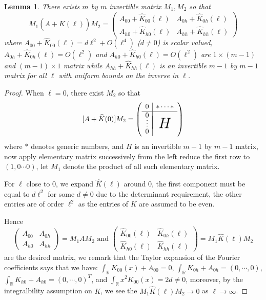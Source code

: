 \documentclass[letterpaper,11pt]{article}
\newcommand{\R}{\mathbb{R}}
\numberwithin{equation}{section}
\theoremstyle{plain}
\newtheorem{lemma}[theorem]{Lemma}
\begin{document}
\begin{lemma}\label{Lem1} There exists $m$ by $m$ invertible matrix $M_1,M_2$ so that 
\[
M_1(A+\widehat{K}(\ell))M_2 = \begin{pmatrix}
A_{00}+\widehat{K}_{00}(\ell)&  A_{0h}+\widehat{K}_{0h}(\ell) \\
A_{h0}+\widehat{K}_{h0}(\ell)& A_{hh}+\widehat{K}_{hh}(\ell)
\end{pmatrix}
\]
where $A_{00}+\widehat{K}_{00}(\ell)=d\ell^2 + O(\ell^4)$ ($d\neq 0$) is scalar valued, $A_{0h}+\widehat{K}_{0h}(\ell) = O(\ell^2)$ and $A_{h0}+\widehat{K}_{h0}(\ell) = O(\ell^2)$ are $1 \times (m-1)$ and $(m-1)\times 1$ matrix while $A_{hh}+\widehat{K}_{hh}(\ell)$ is an invertible $m-1$ by $m-1$ matrix for all $\ell$ with uniform bounds on the inverse in $\ell$.
\end{lemma}
\begin{proof}
When $\ell = 0$, there exist $M_2$ so that 
\[
[A+\widehat{K}(0)]M_2 = \left(
\begin{array}{c|c}
  0 & \ast \cdots \ast \\ \hline
  0 & \raisebox{-15pt}{{\huge\mbox{{$H$}}}} \\[-4ex]
  \vdots & \\[-0.5ex]
  0 &
\end{array}
\right)
\]
where $\ast$ denotes generic numbers, and $H$ is an invertible $m-1$ by $m-1$ matrix, now apply elementary matrix successively from the left reduce the first row to $(1,0\cdots0)$, let $M_1$ denote the product of all such elementary matrix. 

For $\ell$ close to $0$, we expand $\widehat{K}(\ell)$ around $0$, the first component must be equal to $d\ell^2$ for some $d\neq 0$ due to the determinant requirement, the other entries are of order $\ell^2$ as the entries of $K$ are assumed to be even.

Hence \[
\begin{pmatrix}
A_{00}&  A_{0h} \\
A_{h0}& A_{hh}
\end{pmatrix} = M_1AM_2 \text{ and }\begin{pmatrix}
\widehat{K}_{00}(\ell)&  \widehat{K}_{0h}(\ell)\\
\widehat{K}_{h0}(\ell)& \widehat{K}_{hh}(\ell)
\end{pmatrix} = M_1\widehat{K}(\ell) M_2
\]
are the desired matrix,
we remark that the Taylor expansion of the Fourier coefficients says that we have: $\int_{\R} K_{00}(x) + A_{00} =0$, $\int_{\R} K_{0h} + A_{0h} = (0,\cdots,0)$, $\int_\R K_{h0}+A_{h0} =(0,\cdots,0)^T$, and $\int_{\R} x^2K_{00}(x)=2d \neq 0$, moreover, by the integralbility assumption on $K$, we see the $M_1\widehat{K}(\ell)M_2 \to 0$ as $\ell \to \infty$. 

\end{proof}
\end{document}
